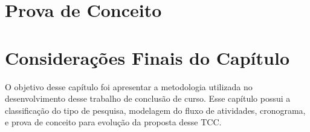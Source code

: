 \section{Prova de Conceito}
\label{sec:provaconceito}


\section{Considerações Finais do Capítulo}

O objetivo desse capítulo foi apresentar a metodologia utilizada no desenvolvimento
desse trabalho de conclusão de curso. Esse capítulo possui a classificação do tipo
de pesquisa, modelagem do fluxo de atividades, cronograma, e prova de conceito para
evolução da proposta desse TCC.
